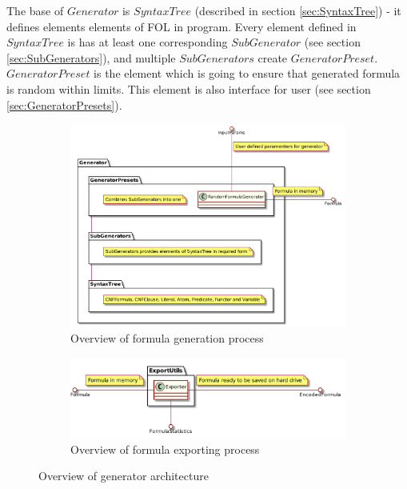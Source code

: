 The base of $Generator$ is $SyntaxTree$ (described in section \ref{sec:SyntaxTree}) - it defines elements elements of \gls{FOL} in program. Every element defined in $SyntaxTree$ is has at least one corresponding $SubGenerator$ (see section \ref{sec:SubGenerators}), and multiple $SubGenerators$ create $GeneratorPreset$. $GeneratorPreset$ is the element which is going to ensure that generated formula is random within limits. This element is also interface for user (see section \ref{sec:GeneratorPresets}).

\begin{figure}[h]
  \centering
  \begin{subfigure}[b]{0.8\textwidth}
    \centering
    \includegraphics[width=\textwidth]{logic-formula-generator/fol/cnf_generator_overview.png}
    \caption{Overview of formula generation process}
    \label{pic:GeneratorOverview}
  \end{subfigure}

  \begin{subfigure}[b]{0.7\textwidth}
    \centering
    \includegraphics[width=\textwidth]{logic-formula-generator/fol/export_overview.png}
    \caption{Overview of formula exporting process}
    \label{pic:ExportOverview}
  \end{subfigure}
  \caption{Overview of generator architecture}
  \label{pic:ExportAndGeneratorOverview}
\end{figure}

